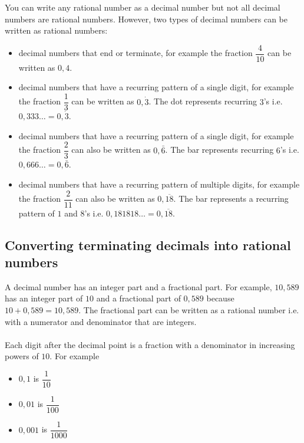 You can write any rational number as a decimal number but not all decimal numbers are rational numbers. However, two types of decimal numbers can be written as rational numbers:\par 
\begin{itemize}
\item decimal numbers that end or terminate, for example the fraction $\dfrac{4}{10}$ can be written as $0,4$.
\item decimal numbers that have a recurring pattern of a single digit, for example the fraction $\dfrac{1}{3}$ can be written as 
$0,\dot{3}$. 
The dot represents recurring $3$'s i.e.
$0,333\ldots=0,\dot{3}$.
\item decimal numbers that have a recurring pattern of a single digit, for example the fraction $\dfrac{2}{3}$ can also be written as 
$0,\bar{6}$. 
The bar represents recurring $6$'s i.e.
$0,666\ldots=0,\bar{6}$.
\item decimal numbers that have a recurring pattern of multiple digits, for example the fraction $\dfrac{2}{11}$ can also be written as 
$0,\overline{18}$. 
The bar represents a recurring pattern of $1$ and $8$'s i.e.
$0,181818\ldots=0,\overline{18}$.
\end{itemize}





\subsection{Converting terminating decimals into rational numbers}

A decimal number has an integer part and a fractional part. For example, $10,589$ has an integer part of $10$ and a fractional part of $0,589$ because $10+0,589=10,589$. The fractional part can be written as a rational number i.e. with a numerator and denominator that are integers. \\
\\
Each digit after the decimal point is a fraction with a denominator in increasing powers of $10$. For example 
\begin{itemize}
 \item $0,1$ is $\dfrac{1}{10}$
\item $0,01$ is $\dfrac{1}{100}$
\item $0,001$ is $\dfrac{1}{1000}$
\end{itemize}

